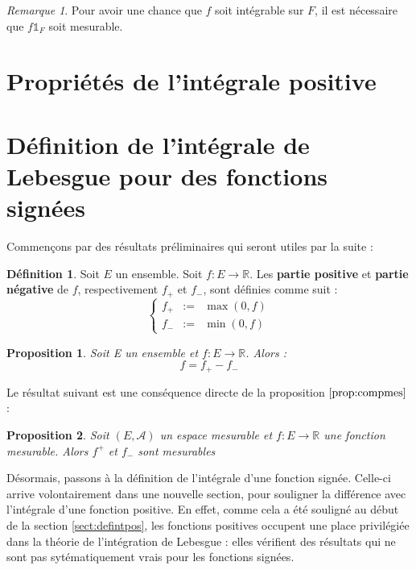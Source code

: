 \documentclass[french]{report}
\theoremstyle{plain}
\newtheorem{prop}{Proposition}[section]
\theoremstyle{definition}
\newtheorem{defi}{Définition}[section]
\theoremstyle{remark}
\newtheorem{rem}{Remarque}[section]
\begin{document}
\begin{rem}
  Pour avoir une chance que $f$ soit intégrable sur $F$, il est nécessaire que $f\mathds{1}_F$ soit mesurable.
\end{rem}


\section{Propriétés de l'intégrale positive}

\section{Définition de l'intégrale de Lebesgue pour des fonctions signées}

Commençons par des résultats préliminaires qui seront utiles par la suite :

\begin{defi}
  \label{def:partieposneg}
  Soit $E$ un ensemble.
  Soit $f:E\longrightarrow\mathbb{R}$.
  Les \textbf{partie positive} et \textbf{partie négative} de $f$, respectivement $f_+$ et $f_-$, sont définies comme suit :
  $$
  \left\{
    \begin{array}{rcl}
      f_+&:=&\max(0,f)\\
      f_-&:=&\min(0,f)
    \end{array}
  \right.
  $$
\end{defi}

\begin{prop}
  Soit E un ensemble et $f:E\longrightarrow\mathbb{R}$.
  Alors :
  $$
  f = f_+ - f_-
  $$
\end{prop}

Le résultat suivant est une conséquence directe de la proposition $\ref{prop:compmes}$ :

\begin{prop}
  \label{prop:partiemes}
  Soit $\left(E,\mathcal{A}\right)$ un espace mesurable et $f:E\longrightarrow\mathbb{R}$ une fonction mesurable.
  Alors $f^+$ et $f_-$ sont mesurables
\end{prop}

Désormais, passons à la définition de l'intégrale d'une fonction signée. Celle-ci arrive volontairement dans une nouvelle section, pour souligner la différence avec l'intégrale d'une fonction positive.
En effet, comme cela a été souligné au début de la section \ref{sect:defintpos}, les fonctions positives occupent une place privilégiée dans la théorie de l'intégration de Lebesgue : elles vérifient des résultats qui ne sont pas sytématiquement vrais pour les fonctions signées.
\end{document}
